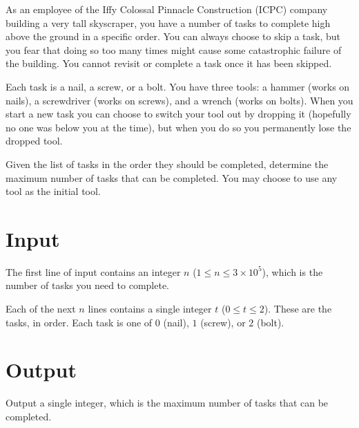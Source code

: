 
As an employee of the Iffy Colossal Pinnacle
Construction (ICPC) company building a very tall skyscraper, you have
a number of tasks to complete high above the ground in a specific
order.  You can always choose to skip a task, but you fear that doing
so too many times might cause some catastrophic failure of the
building. You cannot revisit or complete a task once it has been
skipped.

Each task is a nail, a screw, or a bolt. You have three tools: a
hammer (works on nails), a screwdriver (works on screws), and a wrench
(works on bolts). When you start a new task you can choose to switch
your tool out by dropping it (hopefully no one was below you at
the time), but when you do so you permanently lose the dropped tool.

Given the list of tasks in the order they should be completed,
determine the maximum number of tasks that can be completed.  You may choose to
use any tool as the initial tool.


\section*{Input}

The first line of input contains an integer $n$
($1 \leq n \leq 3 \times 10^5$), which is the number of tasks you need
to complete.  

Each of the next $n$ lines contains a single integer $t$ ($0 \le t \le 2$). These are the tasks, in order.
Each task is one of $0$ (nail), $1$ (screw), or $2$ (bolt).

\section*{Output}

Output a single integer, which is the maximum number of tasks that can be
completed.


